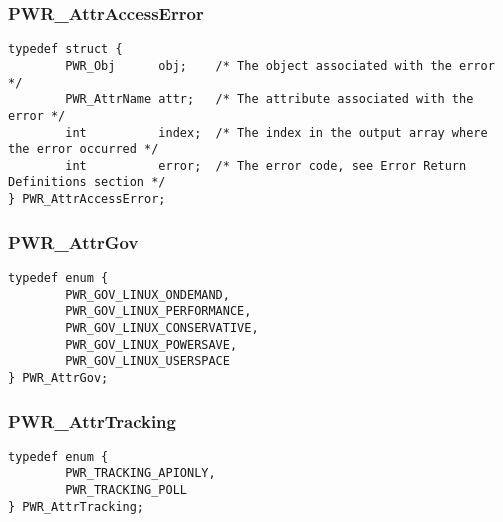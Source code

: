 
\subsubsection{PWR_AttrAccessError}\label{type:AttrAccessError}
\begin{center}
\begin{minipage}{.95\linewidth}%
\begin{lstlisting}
typedef struct {
        PWR_Obj      obj;    /* The object associated with the error */
        PWR_AttrName attr;   /* The attribute associated with the error */
        int          index;  /* The index in the output array where the error occurred */
        int          error;  /* The error code, see Error Return Definitions section */
} PWR_AttrAccessError;
\end{lstlisting}
\end{minipage}
\end{center}


\subsubsection{PWR_AttrGov}\label{type:AttrGov}
\begin{center}
\begin{minipage}{.95\linewidth}%
\begin{lstlisting}
typedef enum {
        PWR_GOV_LINUX_ONDEMAND,
        PWR_GOV_LINUX_PERFORMANCE,
        PWR_GOV_LINUX_CONSERVATIVE,
        PWR_GOV_LINUX_POWERSAVE,
        PWR_GOV_LINUX_USERSPACE
} PWR_AttrGov;
\end{lstlisting}
\end{minipage}
\end{center}


\subsubsection{PWR_AttrTracking}\label{type:AttrTracking}
\begin{center}
\begin{minipage}{.95\linewidth}%
\begin{lstlisting}
typedef enum {
        PWR_TRACKING_APIONLY,
        PWR_TRACKING_POLL
} PWR_AttrTracking;
\end{lstlisting}
\end{minipage}
\end{center}



